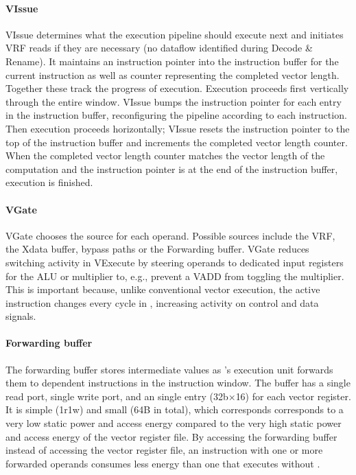 \paragraph{VIssue}
VIssue determines what the execution pipeline should execute next and initiates VRF reads if they are necessary (no dataflow identified during Decode \& Rename).
% 
It maintains an instruction pointer into the instruction buffer for the current instruction as well as counter representing the completed vector length.
% 
Together these track the progress of execution.
% 
Execution proceeds first vertically through the entire window.
% 
VIssue bumps the instruction pointer for each entry in the instruction buffer, reconfiguring the pipeline according to each instruction.
% 
Then execution proceeds horizontally; VIssue resets the instruction pointer to the top of the instruction buffer and increments the completed vector length counter.
% 
When the completed vector length counter matches the vector length of the computation and the instruction pointer is at the end of the instruction buffer, execution is finished.

\paragraph{VGate}
VGate chooses the source for each operand.
% 
Possible sources include the VRF, the Xdata buffer, bypass paths or the Forwarding buffer.
% 
VGate reduces switching activity in VExecute by steering operands to dedicated input registers for the ALU or multiplier to, e.g., prevent a VADD from toggling the multiplier.
%
This is important because, unlike conventional vector execution, the active instruction changes every cycle in \manic, increasing activity on control and data signals.

\paragraph{Forwarding buffer} 
The forwarding buffer stores intermediate values as \manic's execution unit forwards them to
dependent instructions in the instruction window. 
%
The buffer has a single read port, single write port, and an single entry (32b$\times$16) for each vector register.
%
It is simple (1r1w) and small (64B in total), which corresponds
corresponds to a very low static power and access energy compared to the very 
high static power and access energy of the vector register file.
%
By accessing the forwarding buffer instead of accessing the vector register
file, an instruction with one or more forwarded operands consumes less energy
than one that executes without \manic. 

